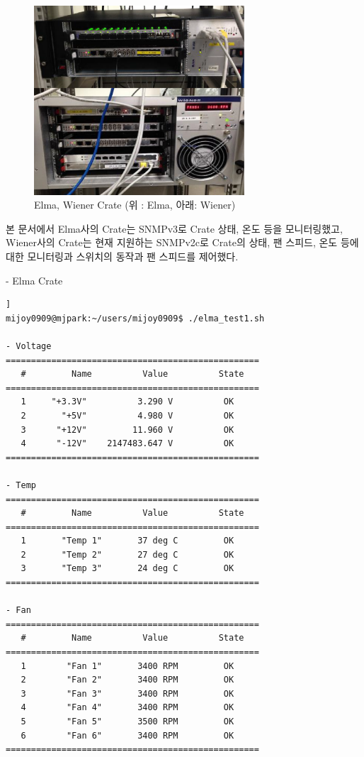 \documentclass[11pt
  , a4paper
  , article
  , oneside
]{memoir}
\begin{document}
\begin{figure}[h]
  \centering
  \includegraphics[width=0.7\textwidth]{./images/elmawiener.eps}
  \caption{Elma, Wiener Crate (위 : Elma, 아래: Wiener)}
  \label{fig:elmawiener}   
\end{figure}

\vspace{2mm}

본 문서에서 Elma사의 Crate는 SNMPv3로 Crate 상태, 온도 등을 모니터링했고, Wiener사의 Crate는 현재 지원하는 SNMPv2c로 Crate의 상태, 팬 스피드, 온도 등에 대한 모니터링과 스위치의 동작과 팬 스피드를  제어했다. 

\clearpage

- Elma Crate
\begin{lstlisting}[style=termstyle, caption=ELMA Crate 모니터링 결과]]
mijoy0909@mjpark:~/users/mijoy0909$ ./elma_test1.sh

- Voltage
==================================================
   #         Name          Value          State
==================================================
   1     "+3.3V"          3.290 V          OK
   2       "+5V"          4.980 V          OK
   3      "+12V"         11.960 V          OK
   4      "-12V"    2147483.647 V          OK
==================================================

- Temp
==================================================
   #         Name          Value          State
==================================================
   1       "Temp 1"       37 deg C         OK
   2       "Temp 2"       27 deg C         OK
   3       "Temp 3"       24 deg C         OK
==================================================

- Fan
==================================================
   #         Name          Value          State
==================================================
   1        "Fan 1"       3400 RPM         OK
   2        "Fan 2"       3400 RPM         OK
   3        "Fan 3"       3400 RPM         OK
   4        "Fan 4"       3400 RPM         OK
   5        "Fan 5"       3500 RPM         OK
   6        "Fan 6"       3400 RPM         OK
==================================================
\end{lstlisting}
\end{document}
